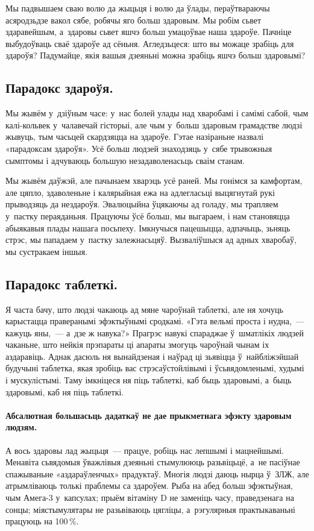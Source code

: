 Мы падвышаем сваю волю да жыцьця і волю да ўлады, пераўтвараючы асяродзьдзе вакол сябе, робячы яго больш здаровым. Мы робім сьвет здаравейшым, а~здаровы сьвет яшчэ больш умацоўвае наша здароўе. Пачніце выбудоўваць сваё здароўе ад сёньня. Агледзьцеся: што вы можаце зрабіць для здароўя? Падумайце, якія вашыя дзеяньні можна зрабіць яшчэ больш здаровымі?

\subsection*{Парадокс здароўя.}

Мы жывём у~дзіўным часе: у~нас болей улады над хваробамі і самімі сабой, чым калі-кольвек у~чалавечай гісторыі, але чым у~больш здаровым грамадстве людзі жывуць, тым часьцей скардзяцца на здароўе. Гэтае назіраньне назвалі «парадоксам здароўя». Усё больш людзей знаходзяць у~сябе трывожныя сымптомы і адчуваюць большую незадаволенасьць сваім станам.

Мы жывём даўжэй, але пачынаем хварэць усё раней. Мы гонімся за камфортам, але цяпло, здаволеньне і калярыйная ежа на адлегласьці выцягнутай рукі прыводзяць да нездароўя. Эвалюцыйна ўцякаючы ад голаду, мы трапляем у~пастку пераяданьня. Працуючы ўсё больш, мы выгараем, і нам становяцца абыякавыя плады нашага посьпеху. Імкнучыся пацешыцца, адпачыць, зьняць стрэс, мы пападаем у~пастку залежнасьцяў. Вызваліўшыся ад адных хваробаў, мы сустракаем іншыя.

\subsection*{Парадокс таблеткі.}

Я часта бачу, што людзі чакаюць ад мяне чароўнай таблеткі, але ня хочуць карыстацца праверанымі эфэктыўнымі сродкамі. «Гэта вельмі проста і нудна,~--- кажуць яны,~--- а~дзе ж навука?» Прагрэс навукі спараджае ў~шматлікіх людзей чаканьне, што нейкія прэпараты ці апараты змогуць чароўнай чынам іх аздаравіць. Аднак дасюль ня вынайдзеная і наўрад ці зьявіцца ў~найбліжэйшай будучыні таблетка, якая зробіць вас стрэсаўстойлівымі і ўсьвядомленымі, худымі і мускулістымі. Таму імкніцеся ня піць таблеткі, каб быць здаровымі, а~быць здаровымі, каб ня піць таблеткі.

\paragraph{Абсалютная большасьць дадаткаў не дае прыкметнага эфэкту здаровым людзям.} А вось здаровы лад жыцьця~--- працуе, робіць нас лепшымі і мацнейшымі. Менавіта сьвядомыя ўважлівыя дзеяньні стымулююць разьвіцьцё, а~не пасіўнае спажываньне «аздараўленчых» прадуктаў. Многія людзі даюць нырца ў~ЗЛЖ, але атрымліваюць толькі праблемы са здароўем. Рыба на абед больш эфэктыўная, чым Амега-3 у~капсулах; прыём вітаміну D не заменіць часу, праведзенага на сонцы; міястымулятары не разьвіваюць цягліцы, а~рэгулярныя практыкаваньні працуюць на 100\,\%.

